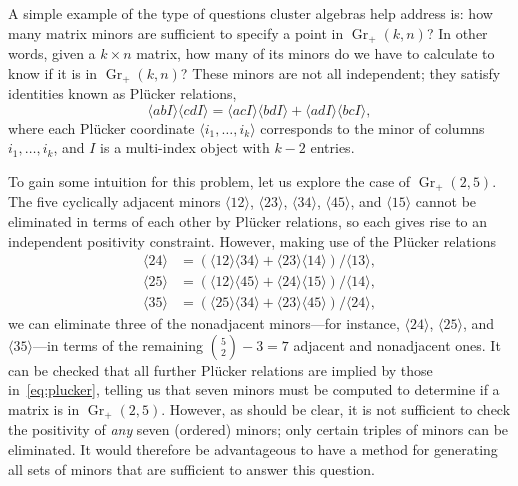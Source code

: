 \documentclass[11pt]{article}
\DeclareMathOperator{\Gr}{Gr}
\def\ket#1{\langle #1 \rangle}
\begin{document}
A simple example of the type of questions cluster algebras help address is: how many matrix minors are sufficient to specify a point in $\Gr_+(k,n)$? In other words, given a $k \times n$ matrix, how many of its minors do we have to calculate to know if it is in $\Gr_+(k,n)$? These minors are not all independent; they satisfy identities known as Pl\"ucker relations,
\begin{equation}
  \label{eq:plucker-rel}
  \ket{abI} \ket{cdI} = \ket{acI} \ket{bdI} + \ket{adI}\ket{bcI},
\end{equation}
where each Pl\"ucker coordinate $\ket{i_1,\ldots,i_k}$ corresponds to the minor of columns $i_1, \ldots,i_k$, and $I$ is a multi-index object with $k-2$ entries.

To gain some intuition for this problem, let us explore the case of $\Gr_+(2,5)$. The five cyclically adjacent minors $\ket{12}$, $\ket{23}$, $\ket{34}$, $\ket{45}$, and $\ket{15}$ cannot be eliminated in terms of each other by Pl\"ucker relations, so each gives rise to an independent positivity constraint. However, making use of the Pl\"ucker relations 
\begin{equation} \label{eq:plucker}
\begin{split}
	\ket{24} &= (\ket{12}\ket{34} + \ket{23}\ket{14})/\ket{13},\\
	\ket{25} &= (\ket{12}\ket{45} + \ket{24}\ket{15})/\ket{14},\\
	\ket{35} &= (\ket{25}\ket{34} + \ket{23}\ket{45})/\ket{24},
\end{split}	 	
\end{equation} 
we can eliminate three of the nonadjacent minors---for instance, $\ket{24}$, $\ket{25}$, and $\ket{35}$---in terms of the remaining ${{5}\choose{2}} - 3 = 7$ adjacent and nonadjacent ones. It can be checked that all further Pl\"ucker relations are implied by those in~\eqref{eq:plucker}, telling us that seven minors must be computed to determine if a matrix is in $\Gr_+(2,5)$. However, as should be clear, it is not sufficient to check the positivity of {\it any} seven (ordered) minors; only certain triples of minors can be eliminated. It would therefore be advantageous to have a method for generating all sets of minors that are sufficient to answer this question.
\end{document}
